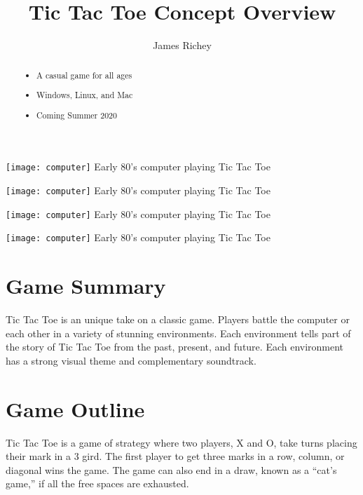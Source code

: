 \documentclass{tufte-handout}
\title{Tic Tac Toe Concept Overview}
\author{James Richey}
\begin{document}
\maketitle


\begin{marginfigure}
  \texttt{[image: computer]}
  Early 80's computer playing Tic Tac Toe
\end{marginfigure}

\begin{marginfigure}
  \texttt{[image: computer]}
  Early 80's computer playing Tic Tac Toe
\end{marginfigure}

\begin{marginfigure}
  \texttt{[image: computer]}
  Early 80's computer playing Tic Tac Toe
\end{marginfigure}

\begin{marginfigure}
  \texttt{[image: computer]}
  Early 80's computer playing Tic Tac Toe
\end{marginfigure}


\begin{abstract}
  \begin{itemize}[noitemsep,label=]
    \item A casual game for all ages
    \item Windows, Linux, and Mac
    \item Coming Summer 2020
  \end{itemize}
\end{abstract}


\section{Game Summary}
Tic Tac Toe is an unique take on a classic game. Players battle the computer or
each other in a variety of stunning environments. Each environment tells part of
the story of Tic Tac Toe from the past, present, and future. Each environment
has a strong visual theme and complementary soundtrack.


\section{Game Outline}
Tic Tac Toe is a game of strategy where two players, X and O, take turns placing
their mark in a 3 gird. The first player to get three marks in a row,
column, or diagonal wins the game. The game can also end in a draw, known as a
``cat's game,'' if all the free spaces are exhausted.
\end{document}
